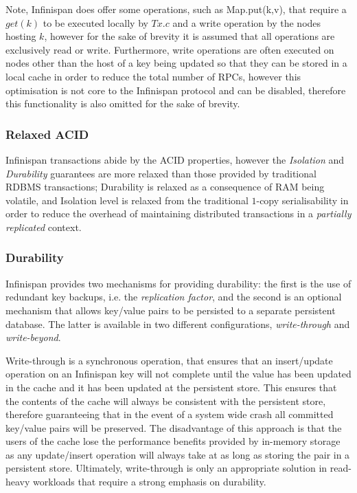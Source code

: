 		Note, Infinispan does offer some operations, such as \textsf{Map.put(k,v)}, that require a $get(k)$ to be executed locally by $Tx.c$ and a write operation by the nodes hosting $k$, however for the sake of brevity it is assumed that all operations are exclusively read or write.  Furthermore, write operations are often executed on nodes other than the host of a key being updated so that they can be stored in a local cache in order to reduce the total number of RPCs, however this optimisation is not core to the Infinispan protocol and can be disabled, therefore this functionality is also omitted for the sake of brevity.  
    
	    \subsubsection{Relaxed ACID}
	    Infinispan transactions abide by the ACID\citep{Haerder:1983:PTD:289.291} properties, however the \emph{Isolation} and \emph{Durability} guarantees are more relaxed than those provided by traditional RDBMS transactions; Durability is relaxed as a consequence of RAM being volatile, and Isolation level is relaxed from the traditional $1$-copy serialisability in order to reduce the overhead of maintaining distributed transactions in a \emph{partially replicated} context.  
	    
		    \subsubsection*{Durability}
		    Infinispan provides two mechanisms for providing durability: the first is the use of redundant key backups, i.e. the \emph{replication factor}, and the second is an optional mechanism that allows key/value pairs to be persisted to a separate persistent database.  The latter is available in two different configurations, \emph{write-through} and \emph{write-beyond}. 
		    
		    Write-through is a synchronous operation, that ensures that an insert/update operation on an Infinispan key will not complete until the value has been updated in the cache and it has been updated at the persistent store.  This ensures that the contents of the cache will always be consistent with the persistent store, therefore guaranteeing that in the event of a system wide crash all committed key/value pairs will be preserved.  The disadvantage of this approach is that the users of the cache lose the performance benefits provided by in-memory storage as any update/insert operation will always take at as long as storing the pair in a persistent store.  Ultimately, write-through is only an appropriate solution in read-heavy workloads that require a strong emphasis on durability.  
		    
